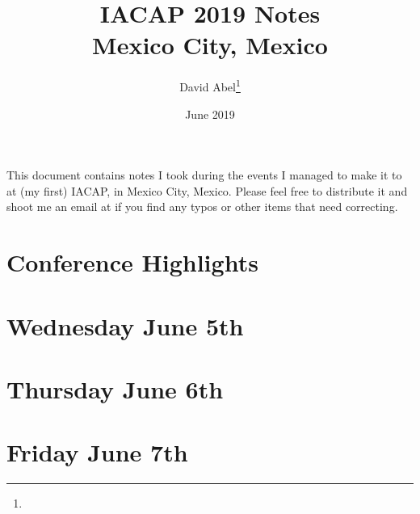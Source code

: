 \documentclass[11pt]{article}
\title{IACAP 2019 Notes \\ \Large{Mexico City, Mexico}}
\author{David Abel\footnote{\durl{http://david-abel.github.io}} \\ \durl{david_abel@brown.edu}}
\date{June 2019}
\begin{document}
\maketitle
\tableofcontents
\newpage


This document contains notes I took during the events I managed to make it to at (my first) IACAP, in Mexico City, Mexico. Please feel free to distribute it and shoot me an email at  if you find any typos or other items that need correcting. 


\section{Conference Highlights}


\newpage
\section{Wednesday June 5th}




\newpage
\section{Thursday June 6th}




\newpage
\section{Friday June 7th}





\newpage


\end{document}
